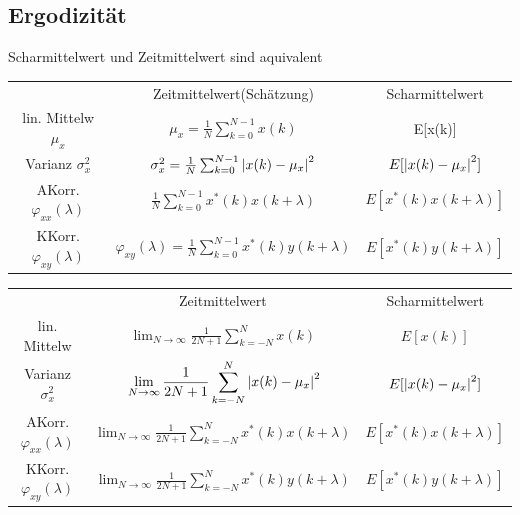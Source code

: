 \documentclass[10pt,a4paper]{article}
\begin{document}
\subsection{Ergodizität}
Scharmittelwert und Zeitmittelwert sind aquivalent\\
\scriptsize
\begin{center}
\begin{tabular}{|c|c|c|}
\cline{1-3}
        & Zeitmittelwert(Schätzung) & Scharmittelwert \\
\cline{1-3}
        lin. Mittelw $\mu_x$ & $\mu_x = \frac{1}{N}\sum_{k=0}^{N-1}x(k)$ & E[x(k)] \\
\cline{1-3}
        Varianz $\sigma_x^2$ & $\sigma_x^2 = \frac{1}{N}\sum_{k=0}^{N-1}\abs{x(k)-\mu_x}^2$ & $E[\abs{x(k)-\mu_x}^2]$ \\
\cline{1-3}
        AKorr. $\varphi_{xx}(\lambda)$ & $\frac{1}{N}\sum_{k=0}^{N-1} x^*(k)x(k+\lambda) $ & $E[x^*(k)x(k+\lambda)]$ \\
\cline{1-3}
        KKorr. $\varphi_{xy}(\lambda)$ & $\varphi_{xy}(\lambda)=\frac{1}{N}\sum_{k=0}^{N-1} x^*(k)y(k+\lambda) $ & $E[x^*(k)y(k+\lambda)]$ \\
\cline{1-3}
\end{tabular}
\end{center}
\begin{center}
\begin{tabular}{|c|c|c|}
\cline{1-3}
        & Zeitmittelwert & Scharmittelwert \\
\cline{1-3}
        lin. Mittelw & $\displaystyle \lim_{N \to \infty}  \frac{1}{2N+1}\sum_{k=-N}^{N}x(k)$ & $E[x(k)]$ \\
\cline{1-3}
        Varianz $\sigma_x^2 $ & $\displaystyle \lim_{N \to \infty}  \frac{1}{2N+1}\sum_{k=-N}^{N}\abs{x(k)-\mu_x}^2$ & $E[\abs{x(k)-\mu_x}^2]$ \\
\cline{1-3}
        AKorr. $\varphi_{xx}(\lambda)$ & $\displaystyle \lim_{N \to \infty}  \frac{1}{2N+1}\sum_{k=-N}^{N} x^*(k)x(k+\lambda) $ & $E[x^*(k)x(k+\lambda)]$ \\
\cline{1-3}
        KKorr. $\varphi_{xy}(\lambda)$ & $\displaystyle \lim_{N \to \infty}  \frac{1}{2N+1}\sum_{k=-N}^{N} x^*(k)y(k+\lambda) $ & $E[x^*(k)y(k+\lambda)]$ \\
\cline{1-3}
\end{tabular}
\end{center}
\normalsize
\end{document}
